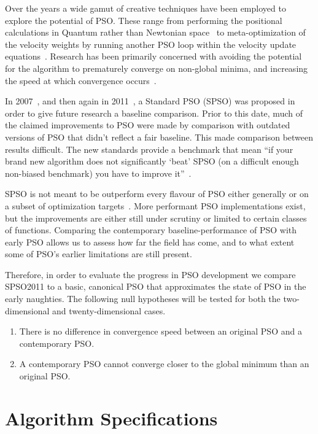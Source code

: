 \documentclass{csfourzero}
\begin{document}
Over the years a wide gamut of creative techniques have been employed to
explore the potential of PSO\@. These range from performing the positional
calculations in Quantum rather than Newtonian space~\cite{Sun:2004kc} to
meta-optimization of the velocity weights by running another PSO loop within
the velocity update equations~\cite{Schoene:2012ir}. Research has been
primarily concerned with avoiding the potential for the algorithm to
prematurely converge on non-global minima, and increasing the speed at which
convergence occurs~\cite{vandenBergh:2002tk}.

In 2007~\cite{Bratton:2007hq}, and then again in 2011~\cite{Clerc:2012to}, a
Standard PSO (SPSO) was proposed in order to give future research a baseline
comparison. Prior to this date, much of the claimed improvements to PSO were
made by comparison with outdated versions of PSO that didn't reflect a fair
baseline. This made comparison between results difficult. The new standards
provide a benchmark that mean  ``if your brand new algorithm does not
significantly `beat' SPSO (on a difficult enough non-biased benchmark) you have
to improve it''~\cite{Clerc:2012to}.

SPSO is not meant to be outperform every flavour of PSO either generally or on
a subset of optimization targets~\cite{Bratton:2007hq}. More performant PSO
implementations exist, but the improvements are either still under scrutiny or
limited to certain classes of functions. Comparing the contemporary
baseline-performance of PSO with early PSO allows us to assess how far the
field has come, and to what extent some of PSO's earlier limitations are still
present.

Therefore, in order to evaluate the progress in PSO development we compare
SPSO2011 to a basic, canonical PSO that approximates the state of PSO in the
early naughties. The following null hypotheses will be tested for both the
two-dimensional and twenty-dimensional cases.

\begin{enumerate}
  \item{There is no difference in convergence speed between an original PSO
      and a contemporary PSO.}
  \item{A contemporary PSO cannot converge closer to the global minimum
      than an original PSO.}
\end{enumerate}

\section{Algorithm Specifications}
\end{document}
